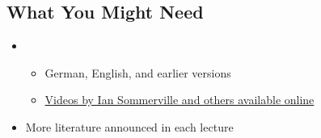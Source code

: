 \begin{frame}{\myframetitle{}}
	\lectureseriesoverview[1]
\end{frame}

\subsection{What You Might Need}

\begin{frame}{\insertsubsection}
	\begin{fancycolumns}[animation=none]
		\centering{}
		\nextcolumn
		\begin{definition}{\mysource{\sommerville}}
			\begin{itemize}
				\item {}
				\begin{itemize}
					\item German, English, and earlier versions
					\item \href{https://software-engineering-book.com/videos/}{Videos by Ian Sommerville and others available online}
				\end{itemize}
				\item More literature announced in each lecture
			\end{itemize}
		\end{definition}
	\end{fancycolumns}
\end{frame}

%
%
%
%
